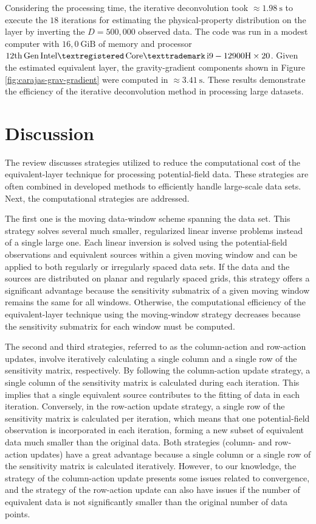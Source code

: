 \documentclass[utf8]{FrontiersinHarvard} %
\begin{document}
	Considering the processing time, the iterative deconvolution took  $\approx 1.98 \: \mathrm{s}$ to execute the $18$
	iterations for estimating the physical-property distribution on the layer by inverting the $D = 500,000$ observed data.
	The code was run in a modest computer with $16,0 \: \mathrm{GiB}$ of memory and processor 
	$\mathrm{12th \, Gen \, Intel\textregistered \, Core\texttrademark \, i9-12900H \times 20}$.
	Given the estimated equivalent layer, the gravity-gradient components shown in Figure \ref{fig:carajas-grav-gradient} were computed in
	$\approx 3.41 \: \mathrm{s}$.
	These results demonstrate the efficiency of the iterative deconvolution method in processing large datasets.
	
	\section{Discussion}
	
	The review discusses strategies utilized to reduce the computational cost of the equivalent-layer technique for processing potential-field data. These strategies are often combined in developed methods to efficiently handle large-scale data sets. 
	Next, the computational strategies are addressed.
	
	The first one is the moving data-window scheme spanning the data set.
	This strategy solves several much smaller, regularized linear inverse problems 
	instead of a single large one.
	Each linear inversion is solved using the potential-field observations and equivalent sources within a given moving window and can be applied to both regularly or irregularly spaced data sets.
	If the data and the sources are distributed on planar and regularly spaced grids, this strategy offers a significant advantage because the sensitivity submatrix of a given moving window remains the same for all windows.
	Otherwise, the computational efficiency of the equivalent-layer technique using the moving-window strategy decreases because the sensitivity submatrix for each window must be computed.
	
	The second and third strategies, referred to as the column-action and row-action updates, involve iteratively calculating a single column and a single row of the sensitivity matrix, respectively.
	By following the column-action update strategy, a single column of the sensitivity matrix is calculated during each iteration. 
	This implies that a single equivalent source contributes to the fitting of data in each iteration.
	Conversely, in the row-action update strategy, a single row of the sensitivity matrix is calculated per iteration, which means that  one potential-field observation is incorporated in each iteration, 
	forming a new subset of equivalent data much smaller than the original data.
	Both strategies (column- and row-action updates) have a great advantage  because a single column or a single row of the sensitivity matrix is calculated iteratively.
	However, to our knowledge, the strategy of the column-action update presents some issues related to convergence, and the strategy of the row-action update can also have issues if the number of equivalent data  is not significantly smaller than the original number of data points.
	
\end{document}
